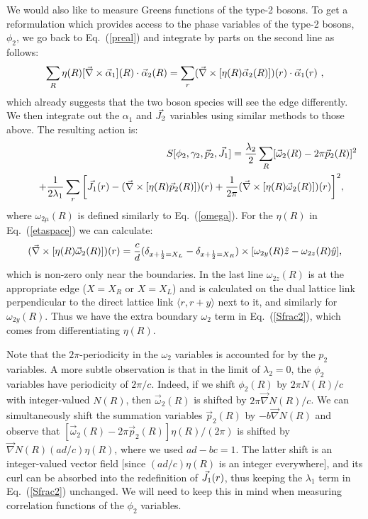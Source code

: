 We would also like to measure Greens functions of the type-2 bosons.  To get a reformulation which provides access to the phase variables of the type-2 bosons, $\phi_2$, we go back to Eq.~(\ref{preal}) and integrate by parts on the second line as follows:
\begin{eqnarray}
 \sum_R \eta(R) [\vec{\nabla}\times\vec{\alpha}_{1}](R) \cdot \vec{\alpha}_{2}(R) 
= \sum_r (\vec{\nabla}\times[\eta(R)\vec{\alpha}_2(R)])(r)\cdot \vec{\alpha}_1(r) ~,
\end{eqnarray}
which already suggests that the two boson species will see the edge differently.
We then integrate out the $\alpha_1$ and $\vec{J}_2$ variables using similar methods to those above. The resulting action is:
\begin{eqnarray}
&&S[\phi_2,\gamma_2,\vec{p}_2,\vec{J}_1]=
\frac{\lambda_2}{2}\sum_R [\vec{\omega}_{2}(R)-2\pi \vec{p}_{2}(R)]^2\nonumber\\
&&~~~~~+\frac{1}{2\lambda_1}\sum_r \bigg[\vec{J}_1(r)-(\vec{\nabla}\times[\eta(R)\vec{p}_2(R)])(r)
+ \frac{1}{2\pi}(\vec{\nabla}\times[\eta(R)\vec{\omega}_2(R)])(r) \bigg]^2 , ~~~~
\label{Sfrac2}
\end{eqnarray}
where $\omega_{2\mu}(R)$ is defined similarly to Eq.~(\ref{omega}). For the $\eta(R)$ in Eq.~(\ref{etaspace}) we can calculate:
\begin{eqnarray}
(\vec{\nabla}\times[\eta(R)\vec{\omega}_{2}(R)])(r) 
 = \frac{c}{d}(\delta_{x+\frac{1}{2}=X_L}-\delta_{x+\frac{1}{2}=X_R})\times
[\omega_{2y}(R)\hat{z}
-\omega_{2z}(R)\hat{y}]\nonumber,
\end{eqnarray}
which is non-zero only near the boundaries.  In the last line $\omega_{2z}(R)$ is at the appropriate edge ($X=X_R$ or $X=X_L$) and is calculated on the dual lattice link perpendicular to the direct lattice link $\langle r, r+\hat{y}\rangle$ next to it, and similarly for $\omega_{2y}(R)$.
Thus we have the extra boundary $\omega_2$ term in Eq.~(\ref{Sfrac2}), which comes from differentiating $\eta(R)$. 

Note that the $2\pi$-periodicity in the $\omega_2$ variables is accounted for by the $p_2$ variables.  A more subtle observation is that in the limit of $\lambda_2 = 0$, the $\phi_2$ variables have periodicity of $2\pi/c$.  Indeed, if we shift $\phi_2(R)$ by $2\pi N(R)/c$ with integer-valued $N(R)$, then $\vec{\omega}_2(R)$ is shifted by $2\pi \vec{\nabla}N(R)/c$.  We can simultaneously shift the summation variables $\vec{p}_2(R)$ by $-b\vec{\nabla}N(R)$ and observe that $[\vec{\omega}_2(R) - 2\pi \vec{p}_2(R)] \eta(R)/(2\pi)$ is shifted by $\vec{\nabla}N(R) (ad/c)\eta(R)$, where we used $ad - bc = 1$.  The latter shift is an integer-valued vector field [since $(ad/c)\eta(R)$ is an integer everywhere], and its curl can be absorbed into the redefinition of ${\vec{J}}_1(r)$, thus keeping the $\lambda_1$ term in Eq.~(\ref{Sfrac2}) unchanged.  We will need to keep this in mind when measuring correlation functions of the $\phi_2$ variables.

